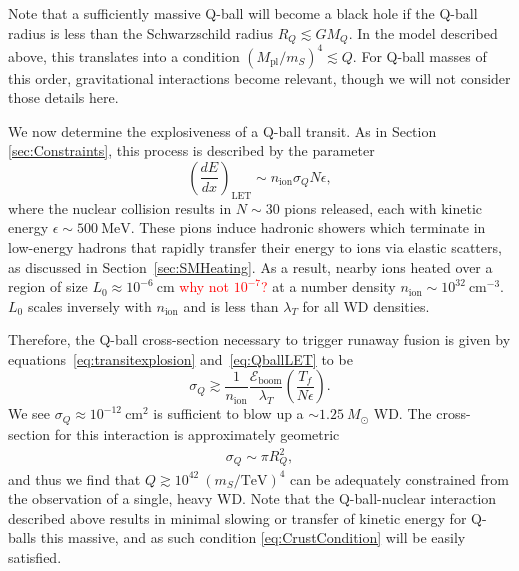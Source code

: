 \documentclass[twocolumn, preprintnumbers,amsmath,amssymb,prd, superscriptaddress]{revtex4}
\newcommand{\Eboom}{\mathcal{E}_\text{boom}}
\def\r{\right)}
\def\l{\left(}
\begin{document}
Note that a sufficiently massive Q-ball will become a black hole if the Q-ball radius is less than the Schwarzschild radius $R_Q \lesssim G M_Q$.
In the model described above, this translates into a condition $(M_\text{pl}/m_S)^4 \lesssim Q$.
For Q-ball masses of this order, gravitational interactions become relevant, though we will not consider those details here.

We now determine the explosiveness of a Q-ball transit.
As in Section \ref{sec:Constraints}, this process is described by the parameter
\begin{equation}
\label{eq:QballLET}
\l\frac{dE}{dx}\r_\text{LET} \sim n_\text{ion} \sigma_Q N \epsilon,
\end{equation}
where the nuclear collision results in $N \sim 30$ pions released, each with kinetic energy $\epsilon \sim 500 ~\text{MeV}$.
These pions induce hadronic showers which terminate in low-energy hadrons that rapidly transfer their energy to ions via elastic scatters, as discussed in Section~\ref{sec:SMHeating}.
As a result, nearby ions heated over a region of size $L_0 \approx 10^{-6} ~\text{cm}$ \textcolor{red}{why not $10^{-7}$?} at a number density $n_\text{ion} \sim 10^{32}~\text{cm}^{-3}$.
$L_0$ scales inversely with $n_\text{ion}$ and is less than $\lambda_T$ for all WD densities.

Therefore, the Q-ball cross-section necessary to trigger runaway fusion is given by equations~\eqref{eq:transitexplosion} and~\eqref{eq:QballLET} to be
\begin{equation}
\sigma_Q \gtrsim \frac{1}{n_\text{ion}} \frac{\Eboom}{\lambda_T} \l \frac{T_f}{N \epsilon} \r.
\end{equation}
We see $\sigma_Q \approx 10^{-12} ~\text{cm}^2$ is sufficient to blow up a $\sim 1.25 ~M_{\odot}$ WD.
The cross-section for this interaction is approximately geometric
\begin{align}
\sigma_Q \sim \pi R_Q^2,
\end{align}
and thus we find that $Q \gtrsim 10^{42} ~(m_S/\text{TeV})^4$ can be adequately constrained from the observation of a single, heavy WD.
Note that the Q-ball-nuclear interaction described above results in minimal slowing or transfer of kinetic energy for Q-balls this massive, and as such condition \eqref{eq:CrustCondition} will be easily satisfied.
\end{document}
